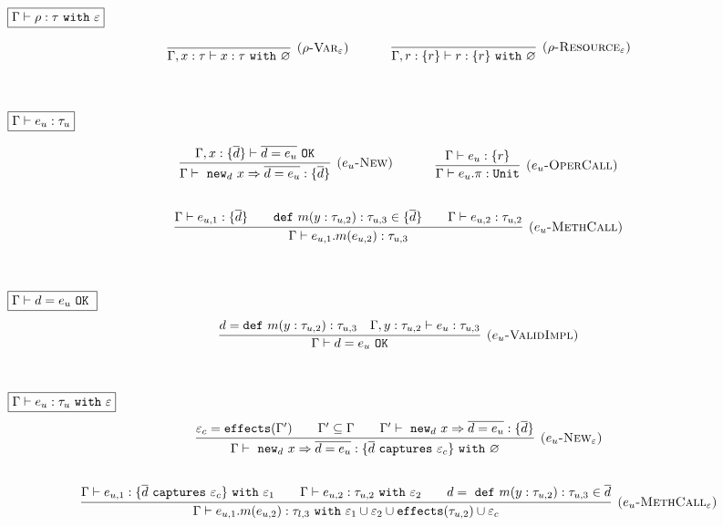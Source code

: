 \documentclass{llncs}
\newcommand{\keywadj}[1]{\mathtt{#1}}
\newcommand{\keyw}[1]{\keywadj{#1}~}
\newcommand{\kw}[1]{\keyw{ #1 }}
\newcommand{\kwa}[1]{\keywadj{ #1 }}
\newcommand{\type}[2]{
	#1~\keyw{with} #2
}
\begin{document}
\noindent
$\fbox{$\Gamma \vdash \rho : \type{\tau}{\varepsilon}$}$

\[
\begin{array}{c}

\infer[\textsc{($\rho$-Var$_\varepsilon$)}]
	{\Gamma, x : \tau \vdash x : \type{\tau}{\varnothing}}
	{}
~~~~~~~~~~
\infer[\textsc{($\rho$-Resource$_\varepsilon$)}]
	{\Gamma, r : \{ r \} \vdash r : \type{\{ r \}}{\varnothing}}
	{} \\[6ex]

\end{array}
\]

\noindent
$\fbox{$\Gamma \vdash e_u : \tau_u$}$

\[
\begin{array}{c}
\infer[\textsc{($e_u$-New)}]
	{\Gamma \vdash~\kwa{new}_d~x \Rightarrow \overline{ d = e_u } : \{ \overline{d} \}}
	{\Gamma, x : \{ \overline{d} \} \vdash \overline{d = e_u}~\keywadj{OK}}
~~~~~~~~~~
\infer[\textsc{($e_u$-OperCall)}]
	{\Gamma \vdash e_u.\pi : \keywadj{Unit}}
	{\Gamma \vdash e_u : \{ r \}} \\[5ex]

\infer[\textsc{($e_u$-MethCall)}]
	{\Gamma \vdash e_{u, 1}.m(e_{u, 2}) : \tau_{u, 3}}
	{\Gamma \vdash e_{u, 1} : \{ \overline{ d }\} &~~~ \keyw{def} m(y : \tau_{u, 2}) : \tau_{u, 3} \in \{ \overline{d} \} &~~~  \Gamma \vdash e_{u, 2} : \tau_{u, 2} }\\[6ex]

\end{array}
\]

\noindent
$\fbox{$\Gamma \vdash d = e_u~\keyw{OK}$}$
\[
\begin{array}{c}
\infer[\textsc{($e_u$-ValidImpl)}]
	{\Gamma \vdash d = e_u~\keywadj{OK}}
	{d = \keyw{def} m(y : \tau_{u, 2}) : \tau_{u, 3} & \Gamma, y : \tau_{u, 2} \vdash e_u : \tau_{u, 3}}
	\\[5ex]
\end{array}
\]

\noindent
$\fbox{$\Gamma \vdash e_u : \tau_u~\kw{with} \varepsilon$}$
\[
\begin{array}{c}
\infer[\textsc{($e_u$-New$_\varepsilon$)}]
	{\Gamma \vdash~\kwa{new}_d~x \Rightarrow \overline{ d = e_u } : \{ \overline{d}~\kw{captures} \varepsilon_c \}~ \kw{with} \varnothing }
	{\varepsilon_c = \keywadj{effects}(\Gamma') &~~~ \Gamma' \subseteq \Gamma &~~~ \Gamma' \vdash~\kwa{new}_d~x \Rightarrow \overline{ d = e_u } : \{ \overline{d} \}}
	{}
	\\[5ex]
	
	\infer[\textsc{($e_u$-MethCall$_\varepsilon$)}]
	{\Gamma \vdash e_{u, 1}.m(e_{u, 2}) : \tau_{l, 3}~ \keyw{with} \varepsilon_1 \cup \varepsilon_2 \cup \keywadj{effects}(\tau_{u, 2}) \cup \varepsilon_c}
	{\Gamma \vdash e_{u,1} : \{ \overline{d}~\keyw{captures} \varepsilon_c \}~\keyw{with} \varepsilon_1 &~~~ \Gamma \vdash e_{u,2}:\tau_{u,2}~\keyw{with} \varepsilon_2 &~~~ d =~\keyw{def} m(y:\tau_{u,2}):\tau_{u,3} \in \overline{d} }
	\\[5ex]
\end{array}
\]
\end{document}
